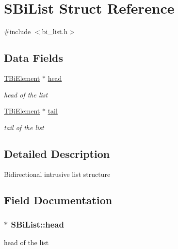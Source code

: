 \hypertarget{structSBiList}{\section{\-S\-Bi\-List \-Struct \-Reference}
\label{structSBiList}
}


{\ttfamily \#include $<$bi\-\_\-list.\-h$>$}

\subsection*{\-Data \-Fields}
\begin{DoxyCompactItemize}
\item 
\hyperlink{bi__element_8h_a50efceeb7874dfcc17d3efc7e4ec90ca}{\-T\-Bi\-Element} $\ast$ \hyperlink{structSBiList_a44736ef707dcb50653b1ce09eb8a9078}{head}
\begin{DoxyCompactList}\small\item\em head of the list \end{DoxyCompactList}\item 
\hyperlink{bi__element_8h_a50efceeb7874dfcc17d3efc7e4ec90ca}{\-T\-Bi\-Element} $\ast$ \hyperlink{structSBiList_a7f46060ee471cb0f6fc88d381a3af593}{tail}
\begin{DoxyCompactList}\small\item\em tail of the list \end{DoxyCompactList}\end{DoxyCompactItemize}


\subsection{\-Detailed \-Description}
\-Bidirectional intrusive list structure 

\subsection{\-Field \-Documentation}
\hypertarget{structSBiList_a44736ef707dcb50653b1ce09eb8a9078}{
\subsubsection[{head}]{$\ast$ {\bf \-S\-Bi\-List\-::head}}}\label{structSBiList_a44736ef707dcb50653b1ce09eb8a9078}


head of the list 

